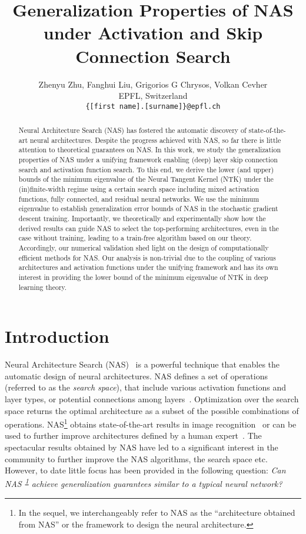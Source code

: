 \documentclass[nohyperref]{article}
\title{Generalization Properties of NAS under Activation and Skip Connection Search}
\author{Zhenyu Zhu, \quad Fanghui Liu, \quad Grigorios G Chrysos, \quad Volkan Cevher\vspace{2mm} \\
{\hspace*{\fill}EPFL, Switzerland\hspace*{\fill}}\\
{\hspace*{\fill}\texttt{\{[first name].[surname]\}@epfl.ch}\hspace*{\fill}}
}
\theoremstyle{plain}
\theoremstyle{definition}
\theoremstyle{remark}
\begin{document}
\maketitle

\begin{abstract}
Neural Architecture Search (NAS) has fostered the automatic discovery of state-of-the-art neural architectures. Despite the progress achieved with NAS, so far there is little attention to theoretical guarantees on NAS. In this work, we study the generalization properties of NAS under a unifying framework enabling (deep) layer skip connection search and activation function search. To this end, we derive the lower (and upper) bounds of the minimum eigenvalue of the Neural Tangent Kernel (NTK) under the (in)finite-width regime using a certain search space including mixed activation functions, fully connected, and residual neural networks. We use the minimum eigenvalue to establish generalization error bounds of NAS in the stochastic gradient descent training. Importantly, we theoretically and experimentally show how the derived results can guide NAS to select the top-performing architectures, even in the case without training, leading to a train-free algorithm based on our theory. Accordingly, our numerical validation shed light on the design of computationally efficient methods for NAS. Our analysis is non-trivial due to the coupling of various architectures and activation functions under the unifying framework and has its own interest in providing the lower bound of the minimum eigenvalue of NTK in deep learning theory.
\end{abstract}

\section{Introduction}
\label{sec:introduction}

Neural Architecture Search (NAS)~\citep{45826} is a powerful technique that enables the automatic design of neural architectures. NAS defines a set of operations (referred to as the \emph{search space}), that include various activation functions and layer types, or potential connections among layers~\citep{JMLR:v20:18-598, Ren2020ACS}. Optimization over the search space returns the optimal architecture as a subset of the possible combinations of operations. NAS\footnote{\label{foot:generalization_nas_architecture} In the sequel, we interchangeably refer to NAS as the ``architecture obtained from NAS'' or the framework to design the neural architecture.} obtains state-of-the-art results in image recognition~\citep{liu2019auto, ding2020autospeech, zhang2019customizable, chen2019detnas} or can be used to further improve architectures defined by a human expert~\citep{tan2019efficientnet}. The spectacular results obtained by NAS have led to a significant interest in the community to further improve the NAS algorithms, the search space etc. However, to date little focus has been provided in the following question: \emph{Can NAS\textsuperscript{~\ref{foot:generalization_nas_architecture}} achieve generalization guarantees similar to a typical neural network?} 
\end{document}
